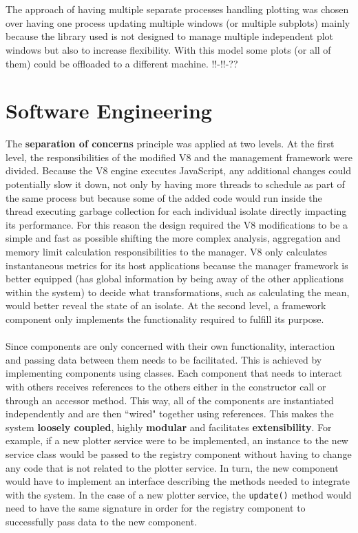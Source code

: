 \documentclass{l4proj}
\begin{document}
\\\\
\hspace*{3em} The approach of having multiple separate processes handling plotting was chosen over having one process updating multiple windows (or multiple subplots) mainly because the library used is not designed to manage multiple independent plot windows but also to increase flexibility. With this model some plots (or all of them) could be offloaded to a different machine. !!-!!-??  
\section{Software Engineering}
\hspace*{3em} The \textbf{separation of concerns} principle was applied at two levels. At the first level, the responsibilities of the modified V8 and the management framework were divided. Because the V8 engine executes JavaScript, any additional changes could potentially slow it down, not only by having more threads to schedule as part of the same process but because some of the added code would run inside the thread executing garbage collection for each individual isolate directly impacting its performance. For this reason the design required the V8 modifications to be a simple and fast as possible shifting the more complex analysis, aggregation and memory limit calculation responsibilities to the manager. V8 only calculates instantaneous metrics for its host applications because the manager framework is better equipped (has global information by being away of the other applications within the system) to decide what transformations, such as calculating the mean, would better reveal the state of an isolate. At the second level, a framework component only implements the functionality required to fulfill its purpose.
\\\\
\hspace*{3em} Since components are only concerned with their own functionality, interaction and passing data between them needs to be facilitated. This is achieved by implementing components using classes. Each component that needs to interact with others receives references to the others either in the constructor call or through an accessor method. This way, all of the components are instantiated independently and are then ``wired" together using references. This makes the system \textbf{loosely coupled}, highly \textbf{modular} and facilitates \textbf{extensibility}. For example, if a new plotter service were to be implemented, an instance to the new service class would be passed to the registry component without having to change any code that is not related to the plotter service. In turn, the new component would have to implement an interface describing the methods needed to integrate with the system. In the case of a new plotter service, the \texttt{update()} method would need to have the same signature in order for the registry component to successfully pass data to the new component. 
\end{document}
